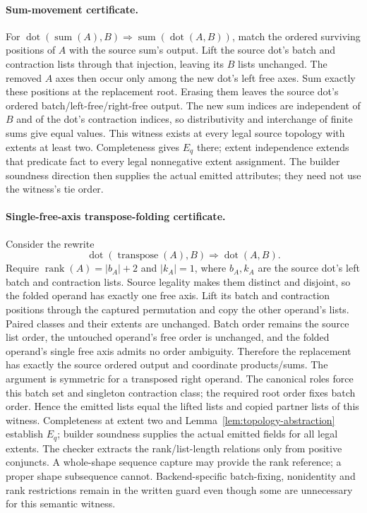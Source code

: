 \paragraph{Sum-movement certificate.}
For $\operatorname{dot}(\operatorname{sum}(A),B)\Rightarrow
\operatorname{sum}(\operatorname{dot}(A,B))$, match the ordered surviving
positions of $A$ with the source sum's output. Lift the source dot's batch
and contraction lists through that injection, leaving its $B$ lists
unchanged. The removed $A$ axes then occur only among the new dot's left
free axes. Sum exactly these positions at the replacement root. Erasing
them leaves the source dot's ordered batch/left-free/right-free output.
The new sum indices are independent of $B$ and of the dot's contraction
indices, so distributivity and interchange of finite sums give equal
values. This witness exists at every legal source topology with extents
at least two. Completeness gives $E_q$ there; extent independence extends
that predicate fact to every legal nonnegative extent assignment. The
builder soundness direction then supplies the actual emitted attributes;
they need not use the witness's tie order.

\paragraph{Single-free-axis transpose-folding certificate.}
Consider the rewrite
\[
 \operatorname{dot}(\operatorname{transpose}(A),B)\Rightarrow
 \operatorname{dot}(A,B).
\]
Require
$\operatorname{rank}(A)=|b_A|+2$ and $|k_A|=1$, where $b_A,k_A$
are the source dot's left batch and contraction lists. Source legality
makes them distinct and disjoint, so the folded operand has exactly one
free axis. Lift its batch and contraction positions through the captured
permutation and copy the other operand's lists. Paired classes and their
extents are unchanged. Batch order remains the source list order, the
untouched operand's free order is unchanged, and the folded operand's
single free axis admits no order ambiguity. Therefore the replacement
has exactly the source ordered output and coordinate products/sums.
The argument is symmetric for a transposed right operand. The canonical
roles force this batch set and singleton contraction class; the required
root order fixes batch order. Hence the emitted lists equal the lifted
lists and copied partner lists of this witness. Completeness
at extent two and Lemma~\ref{lem:topology-abstraction} establish $E_q$;
builder soundness supplies the actual emitted fields for all legal extents.
The checker extracts the rank/list-length relations only from positive
conjuncts. A whole-shape sequence capture may provide the rank reference;
a proper shape subsequence cannot. Backend-specific batch-fixing,
nonidentity and rank restrictions remain in the written guard even though
some are unnecessary for this semantic witness.

